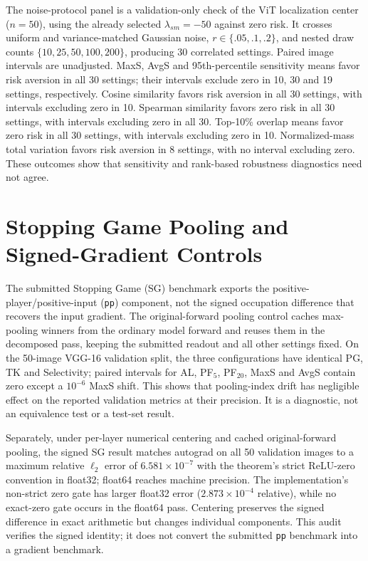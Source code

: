 The noise-protocol panel is a validation-only check of the ViT localization center ($n=50$), using the already selected $\lambda_{sm}=-50$ against zero risk. It crosses uniform and variance-matched Gaussian noise, $r\in\{.05,.1,.2\}$, and nested draw counts $\{10,25,50,100,200\}$, producing 30 correlated settings. Paired image intervals are unadjusted. MaxS, AvgS and 95th-percentile sensitivity means favor risk aversion in all 30 settings; their intervals exclude zero in 10, 30 and 19 settings, respectively. Cosine similarity favors risk aversion in all 30 settings, with intervals excluding zero in 10. Spearman similarity favors zero risk in all 30 settings, with intervals excluding zero in all 30. Top-10\% overlap means favor zero risk in all 30 settings, with intervals excluding zero in 10. Normalized-mass total variation favors risk aversion in 8 settings, with no interval excluding zero. These outcomes show that sensitivity and rank-based robustness diagnostics need not agree.

\section{Stopping Game Pooling and Signed-Gradient Controls}\label{app:rebuttal-sg}

The submitted Stopping Game (SG) benchmark exports the positive-player/positive-input (\texttt{pp}) component, not the signed occupation difference that recovers the input gradient. The original-forward pooling control caches max-pooling winners from the ordinary model forward and reuses them in the decomposed pass, keeping the submitted readout and all other settings fixed. On the 50-image VGG-16 validation split, the three configurations have identical PG, TK and Selectivity; paired intervals for AL, PF$_5$, PF$_{20}$, MaxS and AvgS contain zero except a $10^{-6}$ MaxS shift. This shows that pooling-index drift has negligible effect on the reported validation metrics at their precision. It is a diagnostic, not an equivalence test or a test-set result.

Separately, under per-layer numerical centering and cached original-forward pooling, the signed SG result matches autograd on all 50 validation images to a maximum relative $\ell_2$ error of $6.581\times10^{-7}$ with the theorem's strict ReLU-zero convention in float32; float64 reaches machine precision. The implementation's non-strict zero gate has larger float32 error ($2.873\times10^{-4}$ relative), while no exact-zero gate occurs in the float64 pass. Centering preserves the signed difference in exact arithmetic but changes individual components. This audit verifies the signed identity; it does not convert the submitted \texttt{pp} benchmark into a gradient benchmark.

